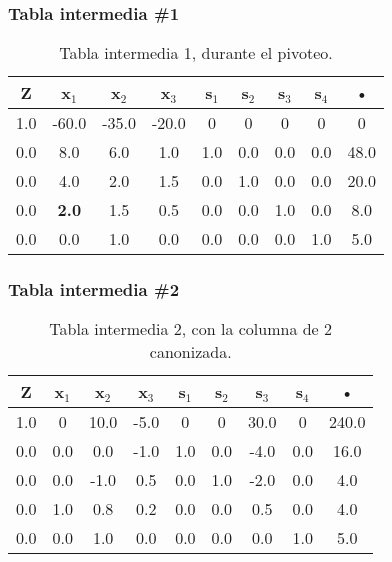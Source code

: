 \documentclass{beamer}
\begin{document}
 
\begin{frame}  
\frametitle{Tabla intermedia \#1} 
\begin{table}[H] 
\begin{center} 
\begin{tabular}{|*{9}{c|}} 
\hline 
\textbf{Z}  & \cellcolor{color_columna_candidata}\textcolor{color_blanco}{\textbf{x$_{1}$}} & \textbf{x$_{2}$} & \textbf{x$_{3}$} & \textbf{s$_{1}$} & \textbf{s$_{2}$} & \textbf{s$_{3}$} & \textbf{s$_{4}$} & \textbf{•} \\\hline \hline 
1.0 & \cellcolor{color_columna_candidata}\textcolor{color_blanco}{-60.0} & -35.0 & -20.0 & 0 & 0 & 0 & 0 & 0 \\\hline 
0.0 & \cellcolor{color_columna_candidata}\textcolor{color_blanco}{8.0} & 6.0 & 1.0 & 1.0 & 0.0 & 0.0 & 0.0 & 48.0\\ 
\hline 
0.0 & \cellcolor{color_columna_candidata}\textcolor{color_blanco}{4.0} & 2.0 & 1.5 & 0.0 & 1.0 & 0.0 & 0.0 & 20.0\\ 
\hline 
0.0 & \cellcolor{color_pivote}\textbf{2.0} & 1.5 & 0.5 & 0.0 & 0.0 & 1.0 & 0.0 & 8.0\\ 
\hline 
0.0 & \cellcolor{color_columna_candidata}\textcolor{color_blanco}{0.0} & 1.0 & 0.0 & 0.0 & 0.0 & 0.0 & 1.0 & 5.0\\ 
\hline 
\end{tabular} 
\caption{Tabla intermedia 1, durante el pivoteo.} 
\end{center} 
\end{table} 
\end{frame} 
 
 
\begin{frame}  
\frametitle{Tabla intermedia \#2} 
\begin{table}[H] 
\begin{center} 
\begin{tabular}{|*{9}{c|}} 
\hline 
\textbf{Z}  & \cellcolor{color_columna_candidata}\textcolor{color_blanco}{\textbf{x$_{1}$}} & \textbf{x$_{2}$} & \textbf{x$_{3}$} & \textbf{s$_{1}$} & \textbf{s$_{2}$} & \textbf{s$_{3}$} & \textbf{s$_{4}$} & \textbf{•} \\\hline \hline 
1.0 & \cellcolor{color_columna_candidata}\textcolor{color_blanco}{0} & 10.0 & -5.0 & 0 & 0 & 30.0 & 0 & 240.0 \\\hline 
0.0 & \cellcolor{color_columna_candidata}\textcolor{color_blanco}{0.0} & 0.0 & -1.0 & 1.0 & 0.0 & -4.0 & 0.0 & 16.0\\ 
\hline 
0.0 & \cellcolor{color_columna_candidata}\textcolor{color_blanco}{0.0} & -1.0 & 0.5 & 0.0 & 1.0 & -2.0 & 0.0 & 4.0\\ 
\hline 
0.0 & \cellcolor{color_columna_candidata}\textcolor{color_blanco}{1.0} & 0.8 & 0.2 & 0.0 & 0.0 & 0.5 & 0.0 & 4.0\\ 
\hline 
0.0 & \cellcolor{color_columna_candidata}\textcolor{color_blanco}{0.0} & 1.0 & 0.0 & 0.0 & 0.0 & 0.0 & 1.0 & 5.0\\ 
\hline 
\end{tabular} 
\caption{Tabla intermedia 2, con la columna de 2 canonizada.} 
\end{center} 
\end{table} 
\end{frame} 
 
\end{document}
